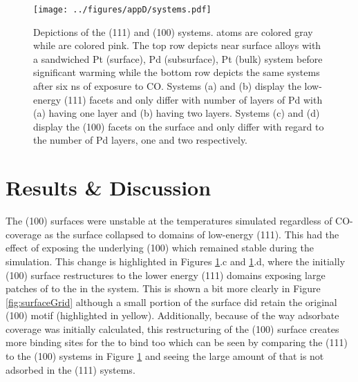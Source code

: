 \begin{landscape}
\begin{figure}[p!]
\centering
  \texttt{[image: ../figures/appD/systems.pdf]}
  \caption{Depictions of the (111) and (100) systems.  atoms are colored
gray while  are colored pink. The top row depicts near surface alloys
with a sandwiched Pt (surface), Pd (subsurface), Pt (bulk) system before
significant warming while the bottom row depicts the same systems after six ns of
exposure to CO. Systems (a) and (b) display the low-energy (111) facets and
only differ with number of layers of Pd with (a) having one layer and (b)
having two layers. Systems (c) and (d) display the (100) facets on the surface
and only differ with regard to the number of Pd layers, one and two
respectively.}
\label{fig:biSystems}
\end{figure}
\end{landscape}

\section{Results \& Discussion}
The (100)  surfaces were unstable at the temperatures
simulated regardless of CO-coverage as the surface  collapsed to domains
of low-energy (111). This had the effect of exposing the underlying (100)  which
remained stable during the simulation. This change is highlighted in Figures
\ref{fig:biSystems}.c and \ref{fig:biSystems}.d, where the initially (100)
surface restructures to the lower energy (111) domains exposing large patches
of  to the  in the system. This is shown a bit more clearly in
Figure \ref{fig:surfaceGrid} although a small portion of the surface did retain
the original (100) motif (highlighted in yellow). Additionally, because of the
way adsorbate coverage was initially calculated, this restructuring of the
(100) surface creates more binding sites for the  to bind too which can
be seen by comparing the (111) to the (100) systems in Figure
\ref{fig:biSystems} and seeing the large amount of  that is not adsorbed
in the (111) systems.

